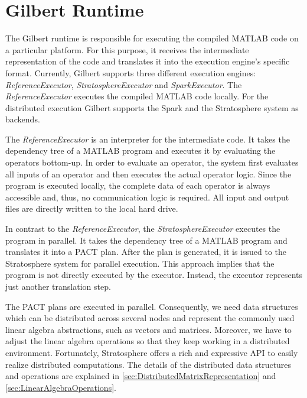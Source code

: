 \chapter{Gilbert Runtime}
\label{cha:gilbertruntime}


The Gilbert runtime is responsible for executing the compiled MATLAB code on a particular platform.
For this purpose, it receives the intermediate representation of the code and translates it into the execution engine's specific format.
Currently, Gilbert supports three different execution engines: \emph{ReferenceExecutor}, \emph{StratosphereExecutor} and \emph{SparkExecutor}.
The \emph{ReferenceExecutor} executes the compiled MATLAB code locally.
For the distributed execution Gilbert supports the Spark and the Stratosphere system as backends.

The \emph{ReferenceExecutor} is an interpreter for the intermediate code.
It takes the dependency tree of a MATLAB program and executes it by evaluating the operators bottom-up.
In order to evaluate an operator, the system first evaluates all inputs of an operator and then executes the actual operator logic.
Since the program is executed locally, the complete data of each operator is always accessible and, thus, no communication logic is required.
All input and output files are directly written to the local hard drive.

In contrast to the \emph{ReferenceExecutor}, the \emph{StratosphereExecutor} executes the program in parallel.
It takes the dependency tree of a MATLAB program and translates it into a PACT plan.
After the plan is generated, it is issued to the Stratosphere system for parallel execution.
This approach implies that the program is not directly executed by the executor.
Instead, the executor represents just another translation step.

The PACT plans are executed in parallel.
Consequently, we need data structures which can be distributed across several nodes and represent the commonly used linear algebra abstractions, such as vectors and matrices.
Moreover, we have to adjust the linear algebra operations so that they keep working in a distributed environment.
Fortunately, Stratosphere offers a rich and expressive API to easily realize distributed computations.
The details of the distributed data structures and operations are explained in \cref{sec:DistributedMatrixRepresentation} and \cref{sec:LinearAlgebraOperations}.

